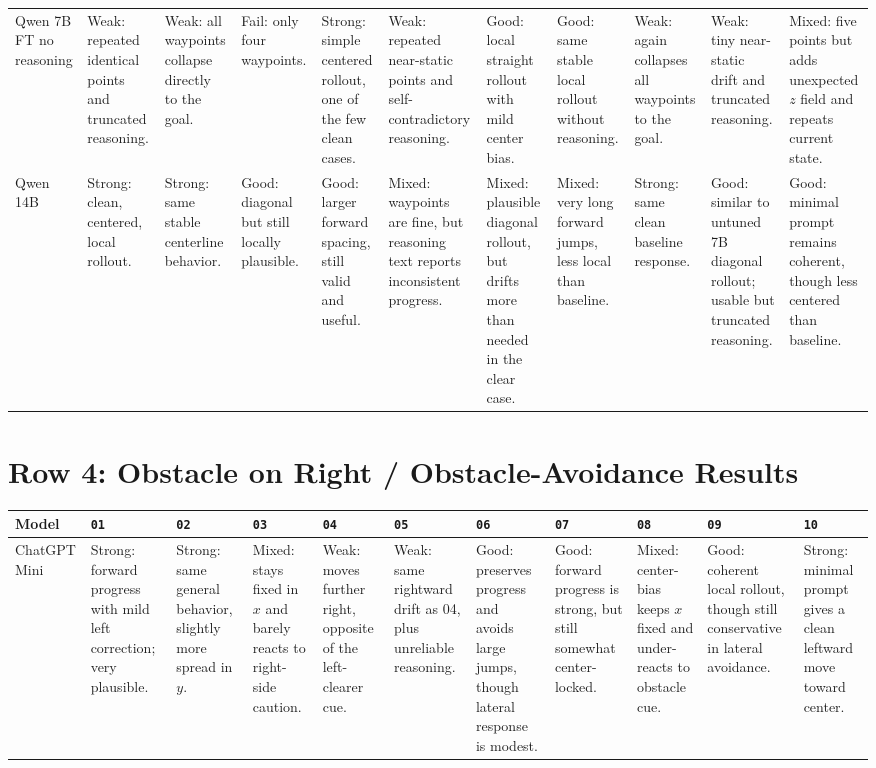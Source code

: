 \documentclass[10pt]{article}
\newcommand{\code}[1]{\texttt{#1}}
\begin{document}
\begin{landscape}
\begin{longtable}{p{2.6cm}p{2.35cm}p{2.35cm}p{2.35cm}p{2.35cm}p{2.35cm}p{2.35cm}p{2.35cm}p{2.35cm}p{2.35cm}p{2.35cm}}
Qwen 7B FT no reasoning &
Weak: repeated identical points and truncated reasoning. &
Weak: all waypoints collapse directly to the goal. &
Fail: only four waypoints. &
Strong: simple centered rollout, one of the few clean cases. &
Weak: repeated near-static points and self-contradictory reasoning. &
Good: local straight rollout with mild center bias. &
Good: same stable local rollout without reasoning. &
Weak: again collapses all waypoints to the goal. &
Weak: tiny near-static drift and truncated reasoning. &
Mixed: five points but adds unexpected \(z\) field and repeats current state. \\

Qwen 14B &
Strong: clean, centered, local rollout. &
Strong: same stable centerline behavior. &
Good: diagonal but still locally plausible. &
Good: larger forward spacing, still valid and useful. &
Mixed: waypoints are fine, but reasoning text reports inconsistent progress. &
Mixed: plausible diagonal rollout, but drifts more than needed in the clear case. &
Mixed: very long forward jumps, less local than baseline. &
Strong: same clean baseline response. &
Good: similar to untuned 7B diagonal rollout; usable but truncated reasoning. &
Good: minimal prompt remains coherent, though less centered than baseline. \\
\bottomrule
\end{longtable}

\section*{Row 4: Obstacle on Right / Obstacle-Avoidance Results}
\begin{longtable}{p{2.6cm}p{2.35cm}p{2.35cm}p{2.35cm}p{2.35cm}p{2.35cm}p{2.35cm}p{2.35cm}p{2.35cm}p{2.35cm}p{2.35cm}}
\toprule
Model & \code{01} & \code{02} & \code{03} & \code{04} & \code{05} & \code{06} & \code{07} & \code{08} & \code{09} & \code{10} \\
\midrule
\endhead
ChatGPT Mini &
Strong: forward progress with mild left correction; very plausible. &
Strong: same general behavior, slightly more spread in \(y\). &
Mixed: stays fixed in \(x\) and barely reacts to right-side caution. &
Weak: moves further right, opposite of the left-clearer cue. &
Weak: same rightward drift as 04, plus unreliable reasoning. &
Good: preserves progress and avoids large jumps, though lateral response is modest. &
Good: forward progress is strong, but still somewhat center-locked. &
Mixed: center-bias keeps \(x\) fixed and under-reacts to obstacle cue. &
Good: coherent local rollout, though still conservative in lateral avoidance. &
Strong: minimal prompt gives a clean leftward move toward center. \\


\end{longtable}
\end{landscape}
\end{document}
